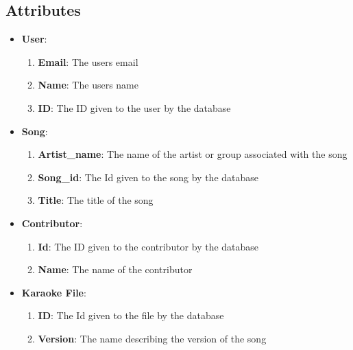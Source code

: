 \documentclass{report}
\begin{document}
    \bigbreak \noindent 
    \subsection{Attributes}
    \begin{itemize}
        \item \textbf{User}:
            \begin{enumerate}
                \item \textbf{Email}: The users email
                \item \textbf{Name}: The users name
                \item \textbf{ID}: The ID given to the user by the database
            \end{enumerate}
        \item \textbf{Song}:
            \begin{enumerate}
                \item \textbf{Artist\_name}: The name of the artist or group associated with the song
                \item \textbf{Song\_id}: The Id given to the song by the database
                \item \textbf{Title}: The title of the song
            \end{enumerate}
        \item \textbf{Contributor}:
            \begin{enumerate}
                \item \textbf{Id}: The ID given to the contributor by the database
                \item \textbf{Name}: The name of the contributor
            \end{enumerate}
        \item \textbf{Karaoke File}:
            \begin{enumerate}
                \item \textbf{ID}: The Id given to the file by the database
                \item \textbf{Version}: The name describing the version of the song
            \end{enumerate}
    \end{itemize}

    \pagebreak 
\end{document}
